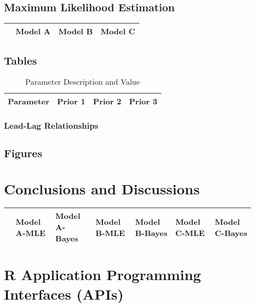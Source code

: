 \subsection{Maximum Likelihood Estimation}

\begin{table}[H]
	\centering
	\small
	\begin{tabular}{rrrr}
		\hline
		& Model A & Model B & Model C \\ 
		\hline
		\hline
	\end{tabular}
\end{table}

\subsection{Tables}

\begin{table}[h]\footnotesize
	\small
	\caption{Parameter Description and Value}
	\begin{tabular}{rp{2cm}p{2cm}p{2cm}}
\hline
Parameter & Prior 1 & Prior 2 & Prior 3 \\
\hline
\hline
\end{tabular}	
\end{table}

\subsubsection{Lead-Lag Relationships}


\subsection{Figures}


\section{Conclusions and Discussions}

\begin{table}[H]
	\centering
	\begin{tabular}{rp{1cm}p{1cm}p{1cm}p{1cm}p{1cm}p{1cm}}
		\hline
		& Model A-MLE & Model A-Bayes & Model B-MLE & Model B-Bayes & Model C-MLE & Model C-Bayes \\ 
		\hline
		\hline
	\end{tabular}
\end{table}


\section{R Application Programming Interfaces (APIs)}


